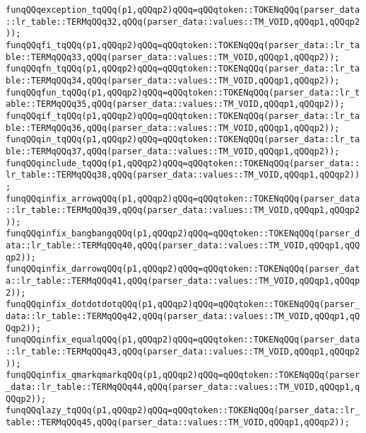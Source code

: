\verb|funqQQqexception_tqQQq(p1,qQQqp2)qQQq=qQQqtoken::TOKENqQQq(parser_data::lr_table::TERMqQQq32,qQQq(parser_data::values::TM_VOID,qQQqp1,qQQqp2));|\newline
\verb|funqQQqfi_tqQQq(p1,qQQqp2)qQQq=qQQqtoken::TOKENqQQq(parser_data::lr_table::TERMqQQq33,qQQq(parser_data::values::TM_VOID,qQQqp1,qQQqp2));|\newline
\verb|funqQQqfn_tqQQq(p1,qQQqp2)qQQq=qQQqtoken::TOKENqQQq(parser_data::lr_table::TERMqQQq34,qQQq(parser_data::values::TM_VOID,qQQqp1,qQQqp2));|\newline
\verb|funqQQqfun_tqQQq(p1,qQQqp2)qQQq=qQQqtoken::TOKENqQQq(parser_data::lr_table::TERMqQQq35,qQQq(parser_data::values::TM_VOID,qQQqp1,qQQqp2));|\newline
\verb|funqQQqif_tqQQq(p1,qQQqp2)qQQq=qQQqtoken::TOKENqQQq(parser_data::lr_table::TERMqQQq36,qQQq(parser_data::values::TM_VOID,qQQqp1,qQQqp2));|\newline
\verb|funqQQqin_tqQQq(p1,qQQqp2)qQQq=qQQqtoken::TOKENqQQq(parser_data::lr_table::TERMqQQq37,qQQq(parser_data::values::TM_VOID,qQQqp1,qQQqp2));|\newline
\verb|funqQQqinclude_tqQQq(p1,qQQqp2)qQQq=qQQqtoken::TOKENqQQq(parser_data::lr_table::TERMqQQq38,qQQq(parser_data::values::TM_VOID,qQQqp1,qQQqp2));|\newline
\verb|funqQQqinfix_arrowqQQq(p1,qQQqp2)qQQq=qQQqtoken::TOKENqQQq(parser_data::lr_table::TERMqQQq39,qQQq(parser_data::values::TM_VOID,qQQqp1,qQQqp2));|\newline
\verb|funqQQqinfix_bangbangqQQq(p1,qQQqp2)qQQq=qQQqtoken::TOKENqQQq(parser_data::lr_table::TERMqQQq40,qQQq(parser_data::values::TM_VOID,qQQqp1,qQQqp2));|\newline
\verb|funqQQqinfix_darrowqQQq(p1,qQQqp2)qQQq=qQQqtoken::TOKENqQQq(parser_data::lr_table::TERMqQQq41,qQQq(parser_data::values::TM_VOID,qQQqp1,qQQqp2));|\newline
\verb|funqQQqinfix_dotdotdotqQQq(p1,qQQqp2)qQQq=qQQqtoken::TOKENqQQq(parser_data::lr_table::TERMqQQq42,qQQq(parser_data::values::TM_VOID,qQQqp1,qQQqp2));|\newline
\verb|funqQQqinfix_equalqQQq(p1,qQQqp2)qQQq=qQQqtoken::TOKENqQQq(parser_data::lr_table::TERMqQQq43,qQQq(parser_data::values::TM_VOID,qQQqp1,qQQqp2));|\newline
\verb|funqQQqinfix_qmarkqmarkqQQq(p1,qQQqp2)qQQq=qQQqtoken::TOKENqQQq(parser_data::lr_table::TERMqQQq44,qQQq(parser_data::values::TM_VOID,qQQqp1,qQQqp2));|\newline
\verb|funqQQqlazy_tqQQq(p1,qQQqp2)qQQq=qQQqtoken::TOKENqQQq(parser_data::lr_table::TERMqQQq45,qQQq(parser_data::values::TM_VOID,qQQqp1,qQQqp2));|\newline
